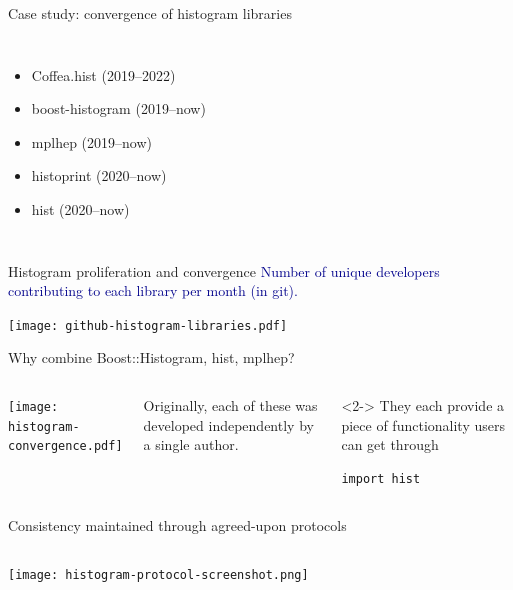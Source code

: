 \begin{frame}{Case study: convergence of histogram libraries}
\begin{uncoverenv}
\begin{columns}
\begin{itemize}
\item Coffea.hist (2019--2022)
\item boost-histogram (2019--now)
\item mplhep (2019--now)
\item histoprint (2020--now)
\item hist (2020--now)
\end{itemize}

\end{columns}
\end{uncoverenv}
\end{frame}

\begin{frame}{Histogram proliferation and convergence}
\vspace{0.25 cm}
\textcolor{darkblue}{Number of unique developers contributing to each library per month (in git).}

\texttt{[image: github-histogram-libraries.pdf]}
\end{frame}

\begin{frame}[fragile]{Why combine Boost::Histogram, hist, mplhep?}
\vspace{0.5 cm}
\begin{columns}
\texttt{[image: histogram-convergence.pdf]}

Originally, each of these was developed independently by a single author.

\vspace{0.75 cm}
\begin{uncoverenv}<2->
They each provide a piece of functionality users can get through

\begin{verbatim}
import hist
\end{verbatim}
\end{uncoverenv}

\vspace{0.75 cm}
\end{columns}
\end{frame}

\begin{frame}{Consistency maintained through agreed-upon protocols}
\vspace{0.5 cm}
\begin{columns}
\texttt{[image: histogram-protocol-screenshot.png]}
\end{columns}
\end{frame}

